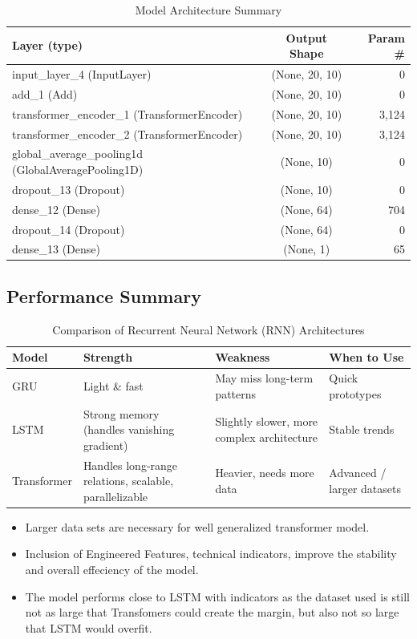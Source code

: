 \begin{table}[h]
\centering
\caption{Model Architecture Summary}
\label{tab:model_summary_2}
\begin{tabular}{|l|c|r|}
\hline
\textbf{Layer (type)} & \textbf{Output Shape} & \textbf{Param \#} \\
\hline
input\_layer\_4 (InputLayer) & (None, 20, 10) & 0 \\
\hline
add\_1 (Add) & (None, 20, 10) & 0 \\
\hline
transformer\_encoder\_1 (TransformerEncoder) & (None, 20, 10) & 3,124 \\
\hline
transformer\_encoder\_2 (TransformerEncoder) & (None, 20, 10) & 3,124 \\
\hline
global\_average\_pooling1d (GlobalAveragePooling1D) & (None, 10) & 0 \\
\hline
dropout\_13 (Dropout) & (None, 10) & 0 \\
\hline
dense\_12 (Dense) & (None, 64) & 704 \\
\hline
dropout\_14 (Dropout) & (None, 64) & 0 \\
\hline
dense\_13 (Dense) & (None, 1) & 65 \\
\hline
\end{tabular}
\end{table}

\subsection{Performance Summary}

\begin{table}[h]
\centering
\caption{Comparison of Recurrent Neural Network (RNN) Architectures}
\label{tab:rnn_comparison}
\begin{tabular}{|l|p{3.5cm}|p{3.5cm}|p{3.5cm}|}
\hline
\textbf{Model} & \textbf{Strength} & \textbf{Weakness} & \textbf{When to Use} \\
\hline
GRU & Light \& fast & May miss long-term patterns & Quick prototypes \\
\hline
LSTM & Strong memory (handles vanishing gradient) & Slightly slower, more complex architecture & Stable trends \\
\hline
Transformer & Handles long-range relations, scalable, parallelizable & Heavier, needs more data & Advanced / larger datasets \\
\hline
\end{tabular}
\end{table}

\begin{itemize}
  \item Larger data sets are necessary for well generalized transformer model.
  \item Inclusion of Engineered Features, technical indicators, improve the stability and overall effeciency of the model.
  \item The model performs close to LSTM with indicators as the dataset used is still not as large that Transfomers could create the margin, but also not so large that LSTM would overfit.
\end{itemize}

